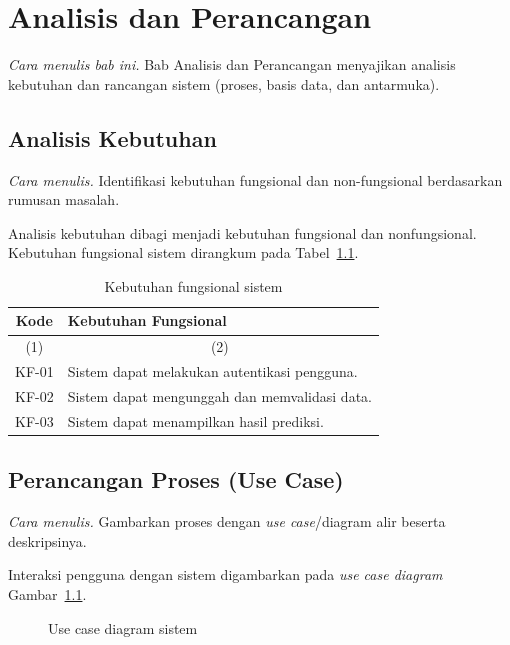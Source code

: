 \chapter{Analisis dan Perancangan}
\emph{Cara menulis bab ini.} Bab Analisis dan Perancangan menyajikan analisis kebutuhan dan rancangan sistem (proses, basis data, dan antarmuka).


\section{Analisis Kebutuhan}
\emph{Cara menulis.} Identifikasi kebutuhan fungsional dan non-fungsional berdasarkan rumusan masalah.

Analisis kebutuhan dibagi menjadi kebutuhan fungsional dan nonfungsional.
Kebutuhan fungsional sistem dirangkum pada Tabel~\ref{tab:fungsional}.

\begin{table}[H]
\centering
\caption{Kebutuhan fungsional sistem}
\label{tab:fungsional}
\begin{tabular}{|c|l|}
\hline
\textbf{Kode} & \textbf{Kebutuhan Fungsional} \\ \hline
\multicolumn{1}{|c|}{(1)} & \multicolumn{1}{c|}{(2)} \\ \hline
KF-01 & Sistem dapat melakukan autentikasi pengguna. \\
KF-02 & Sistem dapat mengunggah dan memvalidasi data. \\
KF-03 & Sistem dapat menampilkan hasil prediksi. \\ \hline
\end{tabular}
\end{table}

\section{Perancangan Proses (Use Case)}
\emph{Cara menulis.} Gambarkan proses dengan \emph{use case}/diagram alir beserta deskripsinya.

Interaksi pengguna dengan sistem digambarkan pada \emph{use case diagram}
Gambar~\ref{gbr:usecase}.

\begin{figure}[H]
\centering
{}
\caption{Use case diagram sistem}
\label{gbr:usecase}
\end{figure}

